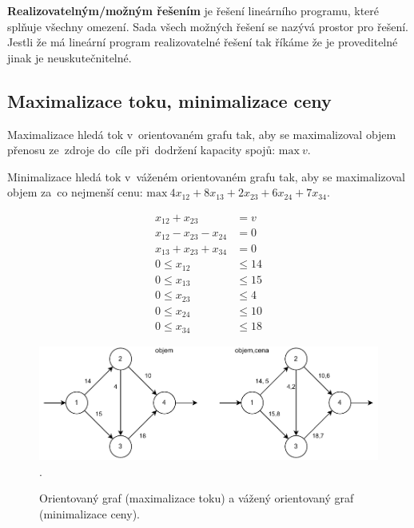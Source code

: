 \textbf{Realizovatelným/možným řešením} je řešení lineárního programu, které splňuje všechny omezení. Sada všech možných řešení se nazývá prostor pro řešení. Jestli že má lineární program realizovatelné řešení tak říkáme že je proveditelné jinak je neuskutečnitelné.

\subsection{Maximalizace toku, minimalizace ceny}

Maximalizace hledá tok v~orientovaném grafu tak, aby se maximalizoval objem přenosu ze~zdroje do~cíle při~dodržení kapacity spojů:
$\text{max}~v$.

Minimalizace hledá tok v~váženém orientovaném grafu tak, aby se maximalizoval objem za~co nejmenší cenu:
$\text{max}\ 4x_{12} + 8x_{13} + 2x_{23} + 6x_{24} + 7x_{34}$.

\begin{center}\begin{minipage}{0.3\textwidth}
        \begin{align}
            x_{12} + x_{23}          & = v     \\
            x_{12} - x_{23} - x_{24} & = 0     \\
            x_{13} + x_{23} + x_{34} & = 0     \\
            0 \leq x_{12}            & \leq 14 \\
            0 \leq x_{13}            & \leq 15 \\
            0 \leq x_{23}            & \leq 4  \\
            0 \leq x_{24}            & \leq 10 \\
            0 \leq x_{34}            & \leq 18
        \end{align}
    \end{minipage}\end{center}

\begin{figure}[ht]
    \centering
    \includegraphics[width=\textwidth]{snimky/ilp}.
    \caption{Orientovaný graf (maximalizace toku) a vážený orientovaný graf (minimalizace ceny).}
\end{figure}


